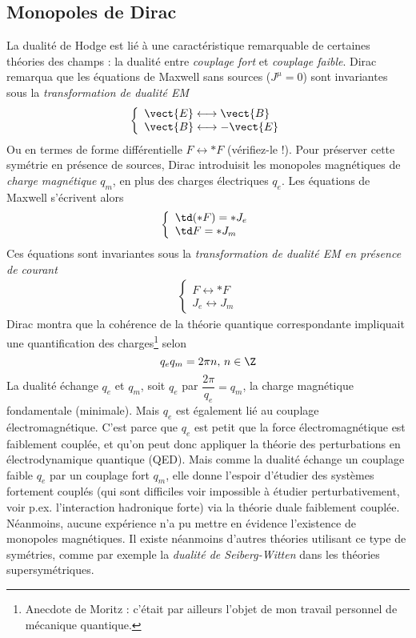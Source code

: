 \subsection{Monopoles de Dirac}
La dualité de Hodge est lié à une caractéristique remarquable de certaines théories des champs : la dualité entre \emph{couplage fort} et \emph{couplage faible}. Dirac remarqua que les équations de Maxwell sans sources ($J^\mu =0$) sont invariantes sous la \emph{transformation de dualité EM}
\begin{align}
    \left\{ 
    \begin{array}{l}
        \vect{E} \longleftrightarrow \vect{B} \\
        \vect{B} \longleftrightarrow - \vect{E}
    \end{array}
    \right.
\end{align}
Ou en termes de forme différentielle $F \longleftrightarrow *F$ (vérifiez-le !). Pour préserver cette symétrie en présence de sources, Dirac introduisit les monopoles magnétiques de \emph{charge magnétique} $q_m$, en plus des charges électriques $q_e$. Les équations de Maxwell s'écrivent alors
\begin{align}
\label{eq:Maxwell Dirac monopoles}
    \left\{
\begin{array}{l}
\td (*F) = *J_e\\
\td F = *J_m
\end{array}
\right.
\end{align}
Ces équations sont invariantes sous la \emph{transformation de dualité EM en présence de courant}
\begin{align}
    \left\{ 
    \begin{array}{l}
        F \longleftrightarrow *F \\
        J_e \longleftrightarrow J_m
    \end{array}
    \right.
\end{align}
Dirac montra que la cohérence de la théorie quantique correspondante impliquait une quantification des charges\footnote{Anecdote de Moritz : c'était par ailleurs l'objet de mon travail personnel de mécanique quantique.} selon
\begin{equation}
    q_e q_m = 2 \pi n, \, n\in \Z
\end{equation}
La dualité échange $q_e$ et $q_m$, soit $q_e$ par $\dfrac{2\pi}{q_e} = q_m$, la charge magnétique fondamentale (minimale). Mais $q_e$ est également lié au couplage électromagnétique. C'est parce que $q_e$ est petit que la force électromagnétique est faiblement couplée, et qu'on peut donc appliquer la théorie des perturbations en électrodynamique quantique (QED). Mais comme la dualité échange un couplage faible $q_e$ par un couplage fort $q_m$, elle donne l'espoir d'étudier des systèmes fortement couplés (qui sont difficiles voir impossible à étudier perturbativement, voir p.ex. l'interaction hadronique forte) via la théorie duale faiblement couplée. Néanmoins, aucune expérience n'a pu mettre en évidence l'existence de monopoles magnétiques. Il existe néanmoins d'autres théories utilisant ce type de symétries, comme par exemple la \emph{dualité de Seiberg-Witten} dans les théories supersymétriques.





